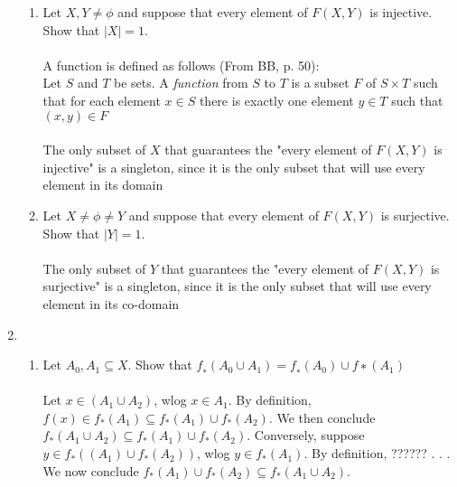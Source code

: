 \documentclass[11pt]{article}
\begin{document}
\begin{enumerate}
\begin{enumerate} %
\item Let $X, Y \neq \phi$ and suppose that every element of $F(X,Y)$ is injective.  Show that $|X| = 1$.
\\ \\
A function is defined as follows (From BB, p. 50):\\
Let $S$ and $T$ be sets. A \emph{function} from $S$ to $T$ is a subset $F$ of $S \times T$ such that for each element $x \in S$ there is exactly one element  $y \in T$ such that $(x,y) \in F$
\\ \\
The only subset of $X$ that guarantees the "every element of $F(X,Y)$ is injective" is a singleton, since it is the only subset that will use every element in its domain
%
\\
\item Let $X \neq \phi \neq Y$ and suppose that every element of $F(X,Y)$ is surjective.  Show that $|Y| = 1$.
\\ \\
The only subset of $Y$ that guarantees the "every element of $F(X,Y)$ is surjective" is a singleton, since it is the only subset that will use every element in its co-domain
\\


\end{enumerate} %

\item %
\begin{enumerate}
\item Let $A_0 , A_1 \subseteq X$. Show that $f_∗ (A_0 ∪ A_1 ) = f_∗ (A_0) \cup f ∗ (A_1)$
\\ \\
Let $x \in (A_1 \cup A_2)$, wlog $x \in A_1$.  By definition, $f(x) \in f_*(A_1) \subseteq f_*(A_1) \cup f_*(A_2).$  We then conclude $f_*(A_1 \cup A_2) \subseteq f_*(A_1) \cup f_*(A_2)$.  Conversely, suppose $y \in f_*((A_1) \cup f_*(A_2))$, wlog $y \in f_*(A_1)$.  By definition, ?????? . . . We now conclude $f_*(A_1) \cup f_*(A_2) \subseteq f_*(A_1 \cup A_2)$.
\\


\end{enumerate}
\end{enumerate}
\end{document}
